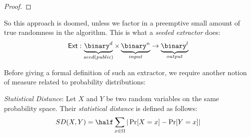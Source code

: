\begin{proof}
%
%
%
%
%
%
%
%
%
%
%

\end{proof}

So this approach is doomed, unless we factor in a preemptive small amount of true randomness in the algorithm. This is what a \emph{seeded extractor} does:
\[
    \ext: \underbrace{\binary^d}_{seed(public)}\times \underbrace{\binary^n}_{input} \to \underbrace{\binary^l}_{output}
\]

Before giving a formal definition of such an extractor, we require another notion of measure related to probability distributions:

\begin{definition} \emph{Statistical Distance}:
    Let $X$ and $Y$ be two random variables on the same probability space. Their \emph{statistical distance} is defined as follows:
    \[
        SD(X, Y) = \half\sum_{x \in \Omega}|\Pr[X = x] - \Pr[Y = x]|
    \]
    
\end{definition}

